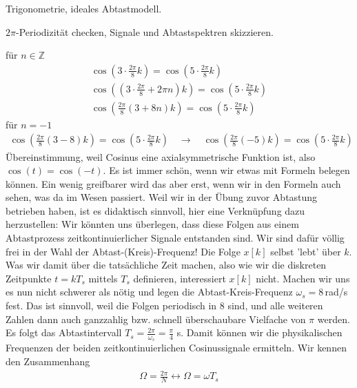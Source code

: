 \begin{Werkzeug}
Trigonometrie, ideales Abtastmodell.
\end{Werkzeug}
\begin{Ansatz}
$2\pi$-Periodizität checken, Signale und Abtastspektren skizzieren.
\end{Ansatz}
\begin{ExCalc}
für $n\in\mathbb{Z}$
\begin{align}
\cos(3\cdot\frac{2\pi}{8}k) = \cos(5\cdot\frac{2\pi}{8}k)\\
\cos\left(\left(3\cdot\frac{2\pi}{8} + 2\pi n\right)k\right) = \cos(5\cdot\frac{2\pi}{8}k)\\
\cos\left(\frac{2\pi}{8}\left(3 + 8 n\right)k\right) = \cos(5\cdot\frac{2\pi}{8}k)
\end{align}
für $n=-1$
\begin{align}
\cos\left(\frac{2\pi}{8}\left(3 - 8\right)k\right) = \cos(5\cdot\frac{2\pi}{8}k)
\quad
\rightarrow
\quad
\cos\left(\frac{2\pi}{8}\left(-5\right)k\right) = \cos(5\cdot\frac{2\pi}{8}k)
\end{align}
Übereinstimmung, weil Cosinus eine axialsymmetrische Funktion ist, also
$\cos(t) = \cos(-t)$.
%
Es ist immer schön, wenn wir etwas mit Formeln belegen können.
%
Ein wenig greifbarer wird das aber erst, wenn wir in den Formeln auch sehen,
was da im Wesen passiert.
%
Weil wir in der Übung zuvor Abtastung betrieben haben, ist es didaktisch sinnvoll,
hier eine Verknüpfung dazu herzustellen: Wir könnten uns überlegen, dass diese
Folgen aus einem Abtastprozess zeitkontinuierlicher Signale entstanden
sind.
%
Wir sind dafür völlig frei in der Wahl der Abtast-(Kreis)-Frequenz!
%
Die Folge $x[k]$ selbst 'lebt' über $k$.
%
Was wir damit über die tatsächliche Zeit machen, also wie wir die diskreten Zeitpunkte
$t=k T_s$ mittels $T_s$ definieren, interessiert $x[k]$ nicht.
%
Machen wir uns es nun nicht schwerer als nötig und legen die Abtast-Kreis-Frequenz
$\omega_s=8$\,rad/s fest. Das ist sinnvoll, weil die Folgen periodisch in 8 sind,
und alle weiteren Zahlen dann auch ganzzahlig bzw. schnell überschaubare
Vielfache von $\pi$ werden.
%
Es folgt das Abtastintervall
$T_s = \frac{2\pi}{\omega_s}=\frac{\pi}{4}$ s.
%
Damit können wir die physikalischen Frequenzen der beiden zeitkontinuierlichen
Cosinussignale ermitteln. Wir kennen den Zusammenhang
\begin{align}
\Omega = \frac{2\pi}{N} \leftrightarrow \Omega = \omega T_s

\end{align}
\end{ExCalc}
